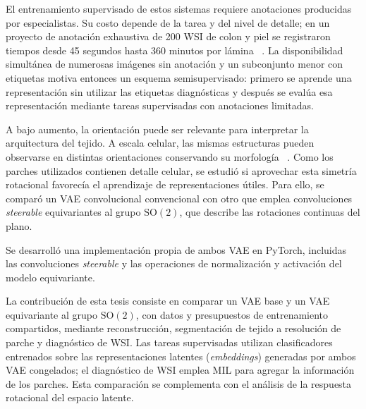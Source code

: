 \begingroup
{}
El entrenamiento supervisado de estos sistemas requiere anotaciones producidas
por especialistas. Su costo depende de la tarea y del nivel de detalle; en un
proyecto de anotación exhaustiva de 200 WSI de colon y piel se registraron
tiempos desde 45 segundos hasta 360 minutos por lámina
~\cite{lindman_annotations_2019}. La disponibilidad simultánea de numerosas
imágenes sin anotación y un subconjunto menor con etiquetas motiva entonces un
esquema semisupervisado: primero se aprende una representación sin utilizar las
etiquetas diagnósticas y después se evalúa esa representación mediante tareas
supervisadas con anotaciones limitadas.
\par\endgroup

\begingroup
{}
A bajo aumento, la orientación puede ser relevante para interpretar la
arquitectura del tejido. A escala celular, las mismas estructuras pueden
observarse en distintas orientaciones conservando su morfología
~\cite{veeling_rotation_2018}. Como los parches utilizados contienen detalle
celular, se estudió si aprovechar esta simetría rotacional favorecía el
aprendizaje de representaciones útiles. Para ello, se comparó un VAE
convolucional convencional con otro que emplea convoluciones \emph{steerable}
equivariantes al grupo \(\mathrm{SO}(2)\), que describe las rotaciones continuas
del plano.
\par\endgroup

Se desarrolló una implementación propia de ambos VAE en PyTorch, incluidas las
convoluciones \emph{steerable} y las operaciones de normalización y activación
del modelo equivariante.

La contribución de esta tesis consiste en comparar un VAE base y un VAE
equivariante al grupo \(\mathrm{SO}(2)\), con datos y presupuestos de
entrenamiento compartidos, mediante reconstrucción, segmentación de tejido a
resolución de parche y diagnóstico de WSI. Las tareas supervisadas utilizan
clasificadores entrenados sobre las representaciones latentes
(\emph{embeddings}) generadas por ambos VAE congelados; el diagnóstico de WSI
emplea MIL para agregar la información de los parches. Esta comparación se
complementa con el análisis de la respuesta rotacional del espacio latente.
